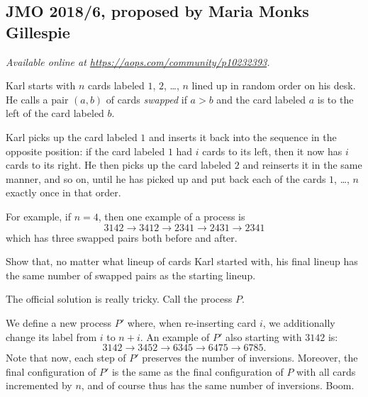 \documentclass[11pt]{scrartcl}
\begin{document}
\subsection{JMO 2018/6, proposed by Maria Monks Gillespie}
\textsl{Available online at \url{https://aops.com/community/p10232393}.}
\begin{mdframed}[style=mdpurplebox,frametitle={Problem statement}]
Karl starts with $n$ cards labeled $1$, $2$, \dots, $n$
lined up in random order on his desk.
He calls a pair $(a,b)$ of cards \emph{swapped} if $a > b$
and the card labeled $a$ is to the left of the card labeled $b$.

Karl picks up the card labeled $1$ and inserts it back into the sequence in
the opposite position: if the card labeled $1$ had $i$ cards to its left,
then it now has $i$ cards to its right.
He then picks up the card labeled $2$ and reinserts it in the same manner,
and so on, until he has picked up and put
back each of the cards $1$, \dots, $n$ exactly once in that order.

For example, if $n = 4$, then one example of a process is
\[ 3142 \longrightarrow 3412 \longrightarrow 2341 \longrightarrow 2431 \longrightarrow 2341 \]
which has three swapped pairs both before and after.

Show that, no matter what lineup of cards Karl started with,
his final lineup has the same number of swapped pairs as the starting lineup.
\end{mdframed}
The official solution is really tricky.
Call the process $P$.

We define a new process $P'$ where, when re-inserting card $i$,
we additionally change its label from $i$ to $n+i$.
An example of $P'$ also starting with $3142$ is:
\[ 3142 \longrightarrow 3452 \longrightarrow 6345
  \longrightarrow 6475 \longrightarrow 6785. \]
Note that now,
each step of $P'$ preserves the number of inversions.
Moreover, the final configuration of $P'$ is the same as
the final configuration of $P$ with all cards incremented by $n$,
and of course thus has the same number of inversions. Boom.
\pagebreak
\end{document}
